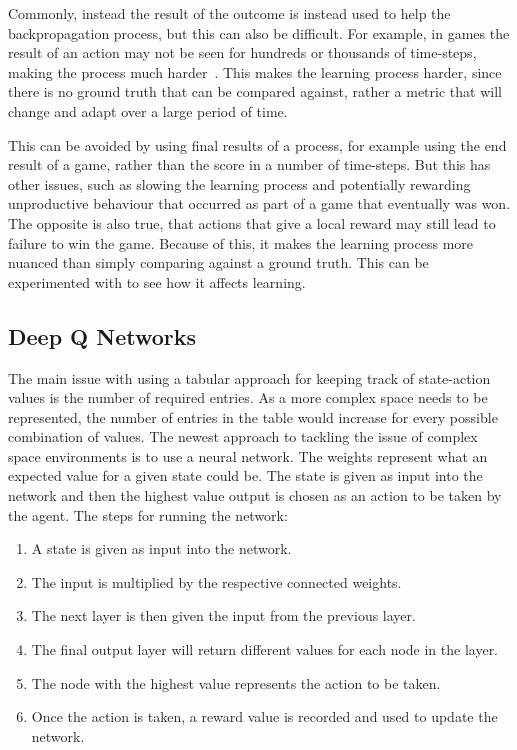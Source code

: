 Commonly, instead the result of the outcome is instead used to help the
backpropagation process, but this can also be difficult. For example,
in games the result of an action may not be seen for hundreds or thousands
of time-steps, making the process much harder~\cite{sutton1984temporal}.
This makes the learning process harder, since there is no ground truth
that can be compared against, rather a metric that will change and adapt
over a large period of time.

This can be avoided by using final results of a process, for example using the
end result of a game, rather than the score in a number of time-steps. But this
has other issues, such as slowing the learning process and potentially rewarding
unproductive behaviour that occurred as part of a game that eventually was won.
The opposite is also true, that actions that give a local reward may still lead
to failure to win the game. Because of this, it makes the learning process more
nuanced than simply comparing against a ground truth. This can be experimented
with to see how it affects learning.

\subsection{Deep Q Networks}

The main issue with using a tabular approach for keeping track of state-action
values is the number of required entries. As a more complex space needs to be
represented, the number of entries in the table would increase for every
possible combination of values. The newest approach to tackling the issue of
complex space environments is to use a neural network. The weights represent
what an expected value for a given state could be. The state is given as input
into the network and then the highest value output is chosen as an action to be
taken by the agent. The steps for running the network:

\begin{enumerate}
    \item A state is given as input into the network.
    \item The input is multiplied by the respective connected weights.
    \item The next layer is then given the input from the previous layer.
    \item The final output layer will return different values for each node in the layer.
    \item The node with the highest value represents the action to be taken.
    \item Once the action is taken, a reward value is recorded and used to update the network.
\end{enumerate}

